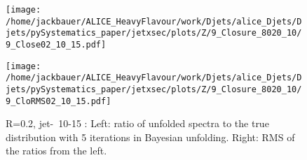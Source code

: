 \begin{figure}
\centering
\begin{minipage}{.5\textwidth}
  \centering
  \texttt{[image: /home/jackbauer/ALICE\_HeavyFlavour/work/Djets/alice\_Djets/Djets/pySystematics\_paper/jetxsec/plots/Z/9\_Closure\_8020\_10/9\_Close02\_10\_15.pdf]}
\end{minipage}%
\begin{minipage}{.5\textwidth}
  \centering
  \texttt{[image: /home/jackbauer/ALICE\_HeavyFlavour/work/Djets/alice\_Djets/Djets/pySystematics\_paper/jetxsec/plots/Z/9\_Closure\_8020\_10/9\_CloRMS02\_10\_15.pdf]}
\end{minipage}
  \caption{R=0.2, jet-\pt\ 10-15 \GeVc: Left: ratio of unfolded spectra to the true distribution with 5 iterations in Bayesian unfolding. Right: RMS of the ratios from the left.}
  \label{fig:UnfClosZchR02_10_15}
\end{figure}

